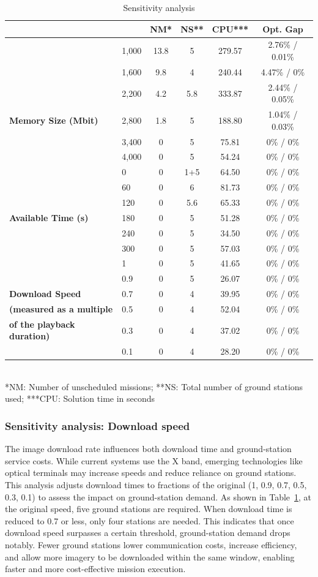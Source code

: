 \documentclass[preprint,3p,12pt,authoryear]{elsarticle}
\begin{document}
\begin{table}[h!]
\caption{Sensitivity analysis}
\label{tab:sensitivity}
\centering
\begin{tabular}{llcccc}
\toprule
 & & NM* & NS** & CPU*** & Opt. Gap \\
\midrule
 & 1,000 & 13.8 & 5 & 279.57 & 2.76\% / 0.01\% \\
 & 1,600 & 9.8 & 4 & 240.44 & 4.47\% / 0\% \\
 & 2,200 & 4.2 & 5.8 & 333.87 & 2.44\% / 0.05\% \\
\textbf{Memory Size (Mbit)} & 2,800 & 1.8 & 5 & 188.80 & 1.04\% / 0.03\% \\
 & 3,400 & 0 & 5 & 75.81 & 0\% / 0\% \\
 & 4,000 & 0 & 5 & 54.24 & 0\% / 0\% \\
\midrule
 & 0 & 0 & 1+5 & 64.50 & 0\% / 0\% \\
 & 60 & 0 & 6 & 81.73 & 0\% / 0\% \\
 & 120 & 0 & 5.6 & 65.33 & 0\% / 0\% \\
\textbf{Available Time (s)} & 180 & 0 & 5 & 51.28 & 0\% / 0\% \\
 & 240 & 0 & 5 & 34.50 & 0\% / 0\% \\
 & 300 & 0 & 5 & 57.03 & 0\% / 0\% \\
\midrule
 & 1 & 0 & 5 & 41.65 & 0\% / 0\% \\
 & 0.9 & 0 & 5 & 26.07 & 0\% / 0\% \\
\textbf{Download Speed} & 0.7 & 0 & 4 & 39.95 & 0\% / 0\% \\
\textbf{(measured as a multiple} & 0.5 & 0 & 4 & 52.04 & 0\% / 0\% \\
 \textbf{of the playback duration)}& 0.3 & 0 & 4 & 37.02 & 0\% / 0\% \\
 & 0.1 & 0 & 4 & 28.20 & 0\% / 0\% \\
\bottomrule
\end{tabular}
\\
*NM: Number of unscheduled missions; **NS: Total number of ground stations used; ***CPU: Solution time in seconds
\end{table}

\subsubsection{Sensitivity analysis: Download speed}
The image download rate influences both download time and ground-station service costs. While current systems use the X band, emerging technologies like optical terminals may increase speeds and reduce reliance on ground stations. This analysis adjusts download times to fractions of the original (1, 0.9, 0.7, 0.5, 0.3, 0.1) to assess the impact on ground-station demand. As shown in Table~\ref{tab:sensitivity}, at the original speed, five ground stations are required. When download time is reduced to 0.7 or less, only four stations are needed. This indicates that once download speed surpasses a certain threshold, ground-station demand drops notably. Fewer ground stations lower communication costs, increase efficiency, and allow more imagery to be downloaded within the same window, enabling faster and more cost-effective mission execution.
\end{document}
